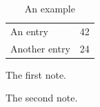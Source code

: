 \documentclass{article}
\begin{document}
	\begin{table}
		\begin{threeparttable}
			\caption{An example}
			
			\begin{tabular}{ll}
				An entry & 42\tnote{1} \\
				Another entry & 24\tnote{2}\\
			\end{tabular}
			\begin{tablenotes}
				\item[1] The first note.
				\item[2] The second note.
			\end{tablenotes}
		\end{threeparttable}
	\end{table}
\end{document}
